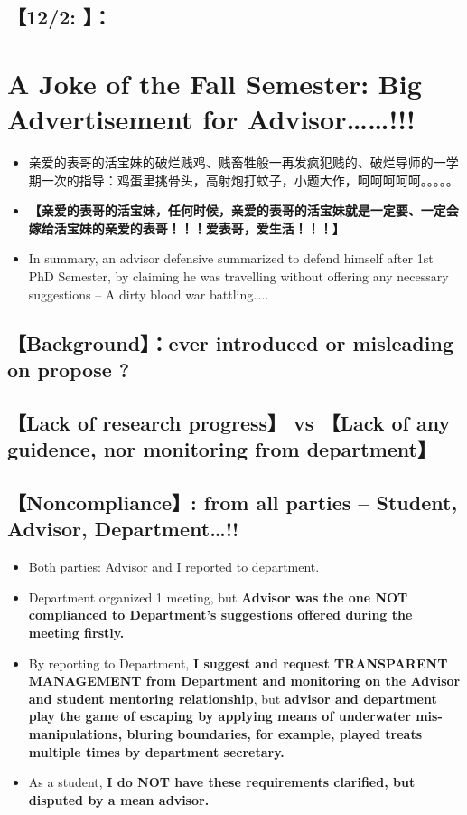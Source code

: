 \documentclass[9pt, b5paper]{article}
\begin{document}
\subsection{【12/2: 】：}
\label{sec-2-7}

\section{A Joke of the Fall Semester: Big Advertisement for Advisor\ldots{}\ldots{}!!!}
\label{sec-3}
\begin{itemize}
\item 亲爱的表哥的活宝妹的破烂贱鸡、贱畜牲般一再发疯犯贱的、破烂导师的一学期一次的指导：鸡蛋里挑骨头，高射炮打蚊子，小题大作，呵呵呵呵呵。。。。。
\item \textbf{【亲爱的表哥的活宝妹，任何时候，亲爱的表哥的活宝妹就是一定要、一定会嫁给活宝妹的亲爱的表哥！！！爱表哥，爱生活！！！】}
\item In summary, an advisor defensive summarized to defend himself after 1st PhD Semester, by claiming he was travelling without offering any necessary suggestions -- A dirty blood war battling\ldots{}..
\end{itemize}
\subsection{【Background】：ever introduced or misleading on propose ?}
\label{sec-3-1}

\subsection{【Lack of research progress】 vs 【Lack of any guidence, nor monitoring from department】}
\label{sec-3-2}

\subsection{【Noncompliance】: from all parties -- Student, Advisor, Department\ldots{}!!}
\label{sec-3-3}
\begin{itemize}
\item Both parties: Advisor and I reported to department.
\item Department organized 1 meeting, but \textbf{Advisor was the one NOT complianced to Department's suggestions offered during the meeting firstly.}
\item By reporting to Department, \textbf{I suggest and request TRANSPARENT MANAGEMENT from Department and monitoring on the Advisor and student mentoring relationship}, but \textbf{advisor and department play the game of escaping by applying means of underwater mis-manipulations, bluring boundaries, for example, played treats multiple times by department secretary.}
\item As a student, \textbf{I do NOT have these requirements clarified, but disputed by a mean advisor.}
\end{itemize}
\end{document}
